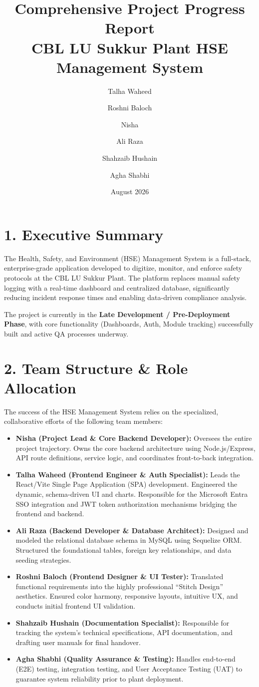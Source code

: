 \documentclass[12pt,a4paper]{article}
\title{\textbf{Comprehensive Project Progress Report}\\ \large CBL LU Sukkur Plant HSE Management System}
\author{Talha Waheed \and Roshni Baloch \and Nisha \and Ali Raza \and Shahzaib Hushain \and Agha Shabhi}
\date{August 2026}
\begin{document}
\maketitle

\section*{1. Executive Summary}
The Health, Safety, and Environment (HSE) Management System is a full-stack, enterprise-grade application developed to digitize, monitor, and enforce safety protocols at the CBL LU Sukkur Plant. The platform replaces manual safety logging with a real-time dashboard and centralized database, significantly reducing incident response times and enabling data-driven compliance analysis.

The project is currently in the \textbf{Late Development / Pre-Deployment Phase}, with core functionality (Dashboards, Auth, Module tracking) successfully built and active QA processes underway.

\section*{2. Team Structure \& Role Allocation}
The success of the HSE Management System relies on the specialized, collaborative efforts of the following team members:
\begin{itemize}[leftmargin=*]
    \item \textbf{Nisha (Project Lead \& Core Backend Developer):} Oversees the entire project trajectory. Owns the core backend architecture using Node.js/Express, API route definitions, service logic, and coordinates front-to-back integration.
    \item \textbf{Talha Waheed (Frontend Engineer \& Auth Specialist):} Leads the React/Vite Single Page Application (SPA) development. Engineered the dynamic, schema-driven UI and charts. Responsible for the Microsoft Entra SSO integration and JWT token authorization mechanisms bridging the frontend and backend.
    \item \textbf{Ali Raza (Backend Developer \& Database Architect):} Designed and modeled the relational database schema in MySQL using Sequelize ORM. Structured the foundational tables, foreign key relationships, and data seeding strategies.
    \item \textbf{Roshni Baloch (Frontend Designer \& UI Tester):} Translated functional requirements into the highly professional ``Stitch Design'' aesthetics. Ensured color harmony, responsive layouts, intuitive UX, and conducts initial frontend UI validation.
    \item \textbf{Shahzaib Hushain (Documentation Specialist):} Responsible for tracking the system's technical specifications, API documentation, and drafting user manuals for final handover.
    \item \textbf{Agha Shabhi (Quality Assurance \& Testing):} Handles end-to-end (E2E) testing, integration testing, and User Acceptance Testing (UAT) to guarantee system reliability prior to plant deployment.
\end{itemize}
\end{document}
